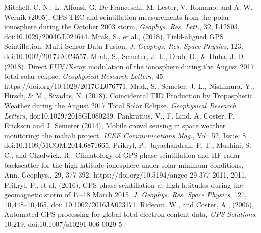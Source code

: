 \documentclass[letterpaper,12pt]{article}
\begin{document}
\begin{thebibliography}{99}
\vspace{-1em}
Mitchell, C. N., L. Alfonsi, G. De Franceschi, M. Lester, V. Romano, and A. W. Wernik (2005), GPS TEC and scintillation measurements from the polar ionosphere during the October 2003 storm, \emph{Geophys. Res.
Lett.}, 32, L12S03, doi:10.1029/2004GL021644.
\vspace{-1em}
Mrak, S., et al., (2018), Field-aligned GPS Scintillation: Multi-Sensor Data Fusion, \emph{J. Geophys. Res. Space Physics}, 123, doi:10.1002/2017JA024557.
\vspace{-1em}
Mrak, S., Semeter, J. L., Drob, D., \& Huba, J. D. (2018). Direct EUV/X-ray modulation of the ionosphere during the August 2017 total solar eclipse. \emph{Geophysical Research Letters}, 45. https://doi.org/10.1029/2017GL076771.
\vspace{-1em}
Mrak, S., Semeter, J. L., Nishimura, Y., Hirsch, \& M., Sivadas, N. (2018). Coincidental TID Production by Tropospheric Weather during the August 2017 Total Solar Eclipse. \emph{Geophysical Research Letters}, doi:10.1029/2018GL080239.
\vspace{-1em}
Pankratius, V., F. Lind, A. Coster, P. Erickson and J. Semeter (2014), Mobile crowd sensing in space weather monitoring: the mahali project, \textit{IEEE Communications Mag.}, 	Vol: 52, Issue: 8, doi:10.1109/MCOM.2014.6871665.
\vspace{-1em}
Prikryl, P., Jayachandran, P. T., Mushini, S. C., and Chadwick, R.: Climatology of GPS phase scintillation and HF radar backscatter for the high-latitude ionosphere under solar minimum conditions, Ann. Geophys., 29, 377-392, https://doi.org/10.5194/angeo-29-377-2011, 2011. 
\vspace{-1em}
Prikryl, P., et al. (2016), GPS phase scintillation at high latitudes during the geomagnetic storm of 17–18 March 2015, \emph{J. Geophys. Res. Space Physics}, 121, 10,448–10,465, doi: 10.1002/2016JA023171. 
\vspace{-1em}
Rideout, W., and Coster, A., (2006), Automated GPS processing for global total electron content data, \textit{GPS Solutions}, 10:219. doi:10.1007/s10291-006-0029-5.

\end{thebibliography}
\end{document}
